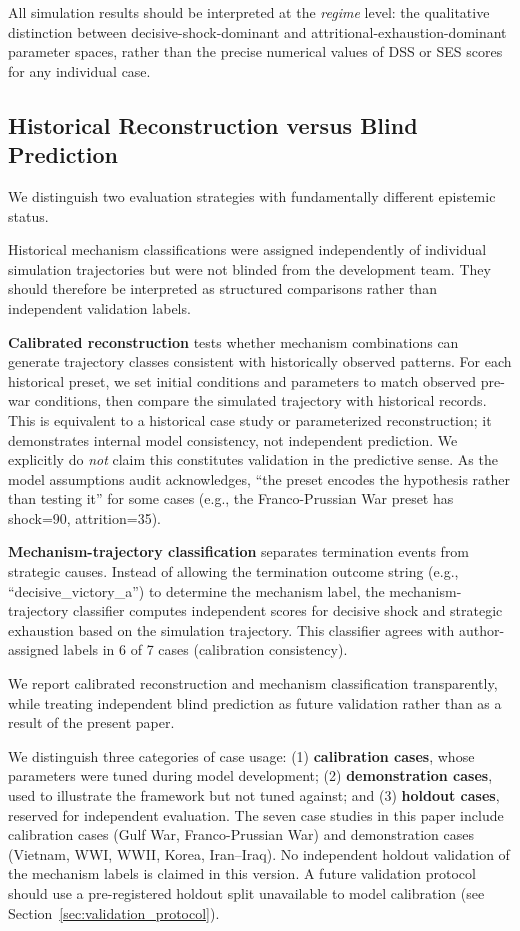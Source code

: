 All simulation results should be interpreted at the \emph{regime} level: the qualitative distinction between decisive-shock-dominant and attritional-exhaustion-dominant parameter spaces, rather than the precise numerical values of DSS or SES scores for any individual case.

\subsection{Historical Reconstruction versus Blind Prediction}

We distinguish two evaluation strategies with fundamentally different epistemic status.

Historical mechanism classifications were assigned independently of individual simulation trajectories but were not blinded from the development team. They should therefore be interpreted as structured comparisons rather than independent validation labels.

\textbf{Calibrated reconstruction} tests whether mechanism combinations can generate trajectory classes consistent with historically observed patterns. For each historical preset, we set initial conditions and parameters to match observed pre-war conditions, then compare the simulated trajectory with historical records. This is equivalent to a historical case study or parameterized reconstruction; it demonstrates internal model consistency, not independent prediction. We explicitly do \emph{not} claim this constitutes validation in the predictive sense. As the model assumptions audit acknowledges, ``the preset encodes the hypothesis rather than testing it'' for some cases (e.g., the Franco-Prussian War preset has shock=90, attrition=35).

\textbf{Mechanism-trajectory classification} separates termination events from strategic causes. Instead of allowing the termination outcome string (e.g., ``decisive\_victory\_a'') to determine the mechanism label, the mechanism-trajectory classifier computes independent scores for decisive shock and strategic exhaustion based on the simulation trajectory. This classifier agrees with author-assigned labels in 6 of 7 cases (calibration consistency).

We report calibrated reconstruction and mechanism classification transparently, while treating independent blind prediction as future validation rather than as a result of the present paper.

We distinguish three categories of case usage: (1) \textbf{calibration cases}, whose parameters were tuned during model development; (2) \textbf{demonstration cases}, used to illustrate the framework but not tuned against; and (3) \textbf{holdout cases}, reserved for independent evaluation. The seven case studies in this paper include calibration cases (Gulf War, Franco-Prussian War) and demonstration cases (Vietnam, WWI, WWII, Korea, Iran--Iraq). No independent holdout validation of the mechanism labels is claimed in this version. A future validation protocol should use a pre-registered holdout split unavailable to model calibration (see Section~\ref{sec:validation_protocol}).

